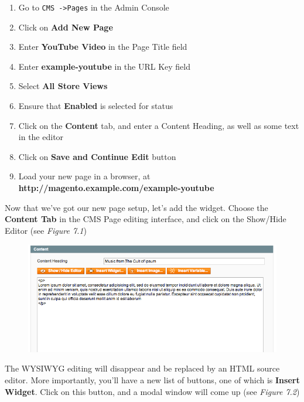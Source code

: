 \documentclass[oneside]{book}
\begin{document}
\begin{enumerate}
\item Go to \footnotesize\texttt{CMS -\textgreater  Pages} \normalsize  in the Admin Console
\item Click on \textbf{Add New Page}
\item Enter \textbf{YouTube Video} in the Page Title field
\item Enter \textbf{example-youtube} in the URL Key field
\item Select \textbf{All Store Views}
\item Ensure that \textbf{Enabled} is selected for status
\item Click on the \textbf{Content} tab, and enter a Content Heading, as well as some text in the editor
\item Click on \textbf{Save and Continue Edit} button
\item Load your new page in a browser, at \textbf{http://magento.example.com/example-youtube}
\end{enumerate}


Now that we've got our new page setup, let's add the widget. Choose the \textbf{Content Tab} in the CMS Page editing interface, and click on the Show/Hide Editor (see \emph{Figure 7.1}) 

\begin{figure}[htb]
\begin{center}
\leavevmode
\includegraphics[width=1\textwidth]{images/chapter7/show-hide.png}
\end{center}
\caption{}
\end{figure}


The WYSIWYG editing will disappear and be replaced by an HTML source editor.  More importantly, you'll have a new list of buttons, one of which is \textbf{Insert Widget}.  Click on this button, and a modal window will come up (see \emph{Figure 7.2}) 
\end{document}
